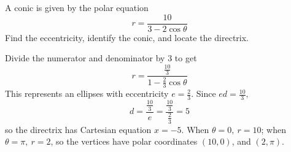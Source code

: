  \begin{example}
    A conic is given by the polar equation
    $$r=\frac{10}{3-2\cos\theta}$$
    Find the eccentricity, identify the conic, and locate the directrix.
  \end{example}
  \begin{solution}
    Divide the numerator and denominator by 3 to get
    $$r=\frac{\frac{10}{3}}{1-\frac{2}{3}\cos\theta}$$
    This represents an ellipses with eccentricity $e=\frac{2}{3}$. Since $ed=\frac{10}{3},$
    $$d=\frac{\frac{10}{3}}{e}=\frac{\frac{10}{3}}{\frac{2}{3}}=5$$
    so the directrix has Cartesian equation $x=-5$. When $\theta=0,\ r=10$; when $\theta=\pi,\ r=2$, so the vertices have polar coordinates $(10,0)$, and $(2,\pi)$.
  \end{solution}
